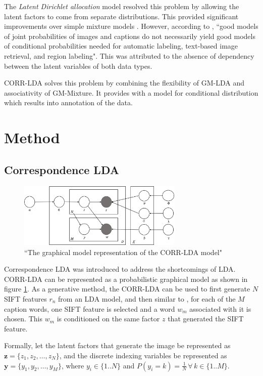 \documentclass[journal]{IEEEtran}
\begin{document}
The \textit{Latent Dirichlet allocation} \cite{blei2003latent} model resolved this problem by allowing the latent factors to come from separate distributions. This provided significant improvements over simple mixture models \cite{corr-lda}. However, according to \cite{corr-lda}, ``good models of joint probabilities of images and captions do not necessarily yield good models of conditional probabilities needed for automatic labeling, text-based image retrieval, and region labeling". This was attributed to the absence of dependency between the latent variables of both data types. 

CORR-LDA  solves this problem by combining the flexibility of GM-LDA and associativity of GM-Mixture. It provides with a model for conditional distribution which results into annotation of the data.

\section{Method}
\subsection{Correspondence LDA}
\begin{figure}
    \centering
    \includegraphics[width= 0.7\textwidth]{images/corrLDA.png}
    \caption{``The graphical model representation of the CORR-LDA model" \cite{corr-lda}}
    \label{fig:corr-lda}
\end{figure}
Correspondence LDA \cite{corr-lda} was introduced to address the shortcomings of LDA. CORR-LDA can be represented as a probabilistic graphical model as shown in figure \ref{fig:corr-lda}. As a generative method, the CORR-LDA can be used to first generate $N$ SIFT features $r_n$ from an LDA model, and then similar to \cite{corr-lda}, for each of the $M$ caption words, one SIFT feature is selected and a word $w_m$ associated with it is chosen. This $w_m$ is conditioned on the same factor $z$ that generated the SIFT feature. 

Formally, let the latent factors that generate the image be represented as $\mathbf{z} = \{z_1, z_2,\dots,z_N \}$, and the discrete indexing variables be represented as $\mathbf{y} = \{y_1, y_2,\dots,y_M \}$, where $y_i \in \{1..N\}$ and $P(y_i = k) = \frac{1}{N} \, \forall \, k \in \{1..M \} $.
\end{document}
